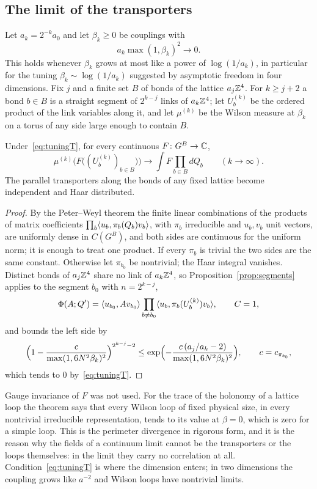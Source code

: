 \subsection{The limit of the transporters}

Let $a_k=2^{-k}a_0$ and let $\beta_k\ge0$ be couplings with
\begin{equation}\label{eq:tuningT}
a_k\max(1,\beta_k)^2\longrightarrow0.
\end{equation}
This holds whenever $\beta_k$ grows at most like a power of $\log(1/a_k)$, in
particular for the tuning $\beta_k\sim\log(1/a_k)$ suggested by asymptotic
freedom in four dimensions. Fix $j$ and a finite set $B$ of bonds of the
lattice $a_j\mathbb{Z}^4$. For $k\ge j+2$ a bond $b\in B$ is a straight segment of
$2^{k-j}$ links of $a_k\mathbb{Z}^4$; let $U_b^{(k)}$ be the ordered product of the
link variables along it, and let $\mu^{(k)}$ be the Wilson measure at
$\beta_k$ on a torus of any side large enough to contain $B$.

\begin{theorem}\label{thm:haarlimit}
Under~\eqref{eq:tuningT}, for every continuous $F\colon G^B\to\mathbb{C}$,
\[
\mu^{(k)}\bigl(F\bigl((U_b^{(k)})_{b\in B}\bigr)\bigr)\longrightarrow
\int F\prod_{b\in B}dQ_b\qquad(k\to\infty).
\]
The parallel transporters along the bonds of any fixed lattice become
independent and Haar distributed.
\end{theorem}

\begin{proof}
By the Peter--Weyl theorem the finite linear combinations of the products
of matrix coefficients $\prod_b\langle u_b,\pi_b(Q_b)v_b\rangle$, with $\pi_b$ irreducible and $u_b,v_b$ unit
vectors, are uniformly dense in $C(G^B)$, and both sides are continuous for
the uniform norm; it is enough to treat one product. If every $\pi_b$ is
trivial the two sides are the same constant. Otherwise let $\pi_{b_0}$ be
nontrivial; the Haar integral vanishes. Distinct bonds of $a_j\mathbb{Z}^4$ share no
link of $a_k\mathbb{Z}^4$, so Proposition~\ref{prop:segments} applies to the segment
$b_0$ with $n=2^{k-j}$,
\[
\Phi(A;Q')=\langle u_{b_0},Av_{b_0}\rangle\prod_{b\ne b_0}\langle u_b,\pi_b(U_b^{(k)})v_b\rangle,
\qquad C=1,
\]
and bounds the left side by
\[
\Bigl(1-\frac{c}{\max(1,6N^2\beta_k)^2}\Bigr)^{2^{k-j}-2}
\le\exp\Bigl(-\frac{c\,(a_j/a_k-2)}{\max(1,6N^2\beta_k)^2}\Bigr),
\qquad c=c_{\pi_{b_0}},
\]
which tends to $0$ by~\eqref{eq:tuningT}.
\end{proof}

Gauge invariance of $F$ was not used. For the trace of the holonomy of a
lattice loop the theorem says that every Wilson loop of fixed physical size,
in every nontrivial irreducible representation, tends to its value at
$\beta=0$, which is zero for a simple loop. This is the perimeter divergence
in rigorous form, and it is the reason why the fields of a continuum limit
cannot be the transporters or the loops themselves: in the limit they carry
no correlation at all. Condition~\eqref{eq:tuningT} is where the dimension
enters; in two dimensions the coupling grows like $a^{-2}$ and Wilson loops
have nontrivial limits.

